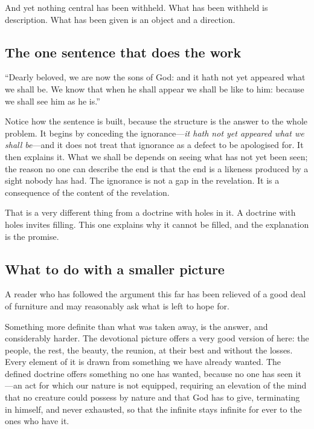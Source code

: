 And yet nothing central has been withheld. What has been withheld is description. What has been given is an object and a direction.

\subsection{The one sentence that does the work}

``Dearly beloved, we are now the sons of God: and it hath not yet appeared what we shall be. We know that when he shall appear we shall be like to him: because we shall see him as he is.''

Notice how the sentence is built, because the structure is the answer to the whole problem. It begins by conceding the ignorance---\emph{it hath not yet appeared what we shall be}---and it does not treat that ignorance as a defect to be apologised for. It then explains it. What we shall be depends on seeing what has not yet been seen; the reason no one can describe the end is that the end is a likeness produced by a sight nobody has had. The ignorance is not a gap in the revelation. It is a consequence of the content of the revelation.

That is a very different thing from a doctrine with holes in it. A doctrine with holes invites filling. This one explains why it cannot be filled, and the explanation is the promise.

\subsection{What to do with a smaller picture}

A reader who has followed the argument this far has been relieved of a good deal of furniture and may reasonably ask what is left to hope for.

Something more definite than what was taken away, is the answer, and considerably harder. The devotional picture offers a very good version of here: the people, the rest, the beauty, the reunion, at their best and without the losses. Every element of it is drawn from something we have already wanted. The defined doctrine offers something no one has wanted, because no one has seen it---an act for which our nature is not equipped, requiring an elevation of the mind that no creature could possess by nature and that God has to give, terminating in himself, and never exhausted, so that the infinite stays infinite for ever to the ones who have it.

